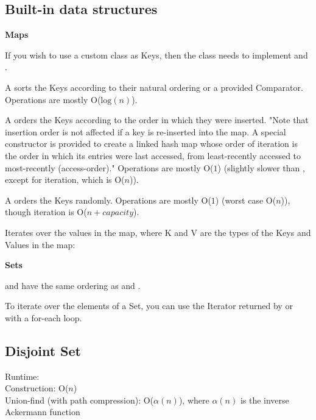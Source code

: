 
\subsection*{Built-in data structures}

\textbf{Maps}

If you wish to use a custom class as Keys, then the class needs to implement  and .

A  sorts the Keys according to their natural ordering or a provided Comparator. Operations are mostly O($\text{log}(n)$).

A  orders the Keys according to the order in which they were inserted. "Note that insertion order is not affected if a key is re-inserted into the map. A special constructor is provided to create a linked hash map whose order of iteration is the order in which its entries were last accessed, from least-recently accessed to most-recently (access-order)." Operations are mostly O($1$) (slightly slower than , except for iteration, which is O($n$)).

A  orders the Keys randomly. Operations are mostly O($1$) (worst case O($n$)), though iteration is O($n+capacity$).

Iterates over the values in the map, where K and V are the types of the Keys and Values in the map:



\textbf{Sets}

 and  have the same ordering as  and .

To iterate over the elements of a Set, you can use the Iterator returned by  or with a for-each loop.

\subsection*{Disjoint Set} 

Runtime: \\
\indent Construction: O($n$) \\
\indent Union-find (with path compression): O($\alpha (n)$), where $\alpha (n)$ is the inverse Ackermann function



